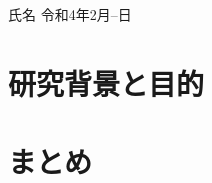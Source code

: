 \documentclass[10pt,a4j]{jsarticle}
\begin{document}
%
{氏名}%
{令和4年2月--日}

\section{研究背景と目的}

\section{まとめ}
\cite{sample1}
\cite{sample4}



%
%

\end{document}
